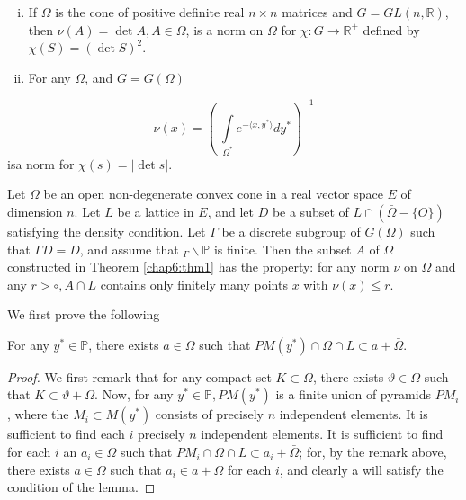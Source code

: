 \begin{examples*}
  \begin{enumerate}[i)]
  \item If $\Omega $ is the cone of positive definite real $n \times n$
    matrices and $G = GL(n, \mathbb{R})$, then $\nu (A)=\det A, A \in
    \Omega$, is a norm on $\Omega$ for $\chi : G \to \mathbb{R}^+$
    defined by $\chi (S) = (\det S)^2$. 

  \item For any $\Omega$, and $G =G (\Omega)$
  \end{enumerate}
  $$
  \nu (x)=\left(~ \int \limits_{\Omega^*} e^{- \langle
    x,y^*\rangle} dy^*\right)^{-1} 
  $$
  is\pageoriginale a norm for $\chi(s)= |\det s | $.
\end{examples*}

\begin{thm}\label{chap6:thm2}%
  Let $\Omega$ be an open non-degenerate convex cone in a real vector
  space $E$ of dimension $n$. Let $L$ be a lattice in $E$, and let $D$
  be a subset of $L \cap (\bar{\Omega}- \{O\})$ satisfying the density
  condition. Let $\Gamma$ be a discrete subgroup of $G(\Omega)$ such
  that $\Gamma D=D$, and assume that ${}_\Gamma \backslash \mathbb{P}$ is
  finite. Then the subset $A$ of $\Omega$ constructed in Theorem
  \ref{chap6:thm1} has 
  the property: for any norm $\nu$ on $\Omega$ and any $r > \circ, A \cap L$
  contains only finitely many points $x$ with $\nu (x) \leq r$. 
\end{thm}

We first prove the following

\begin{lem}\label{chap6:lem12}%
  For any $y^* \in \mathbb{P}$, there exists $a \in \Omega$ such that
  $PM (y^*) \cap \Omega \cap L \subset a+ \bar{\Omega}$. 
\end{lem}

\begin{proof}
  We first remark that for any compact set $K \subset \Omega$, there
  exists $\vartheta \in \Omega$ such that $K \subset \vartheta +
  \Omega$. Now, for any $y^* \in \mathbb{P}, PM(y^*)$ is a finite union
  of pyramids $PM_i$, where the $M_i \subset M(y^*)$ consists of
  precisely $n$ independent elements. It is sufficient to find each $i$
  precisely $n$ independent elements. It is sufficient to find for each
  $i$ an $a_i \in \Omega $ such that $PM_i \cap \Omega \cap L \subset
  a_i + \bar {\Omega}$; for, by the remark above, there exists $a \in
  \Omega $ such that $a_i \in a+ \Omega $ for each $i$, and clearly a
  will satisfy the condition of the lemma. 
\end{proof}

